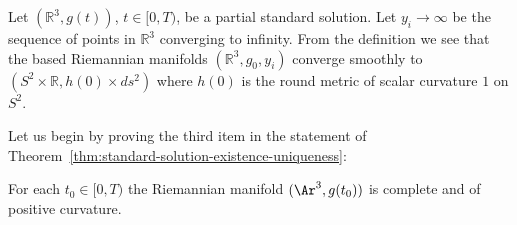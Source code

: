 Let $\left( \mathbb{R}^{3},g(t)
\right)$, $t\in [0,T)$, be a partial standard solution. Let
$y_{i}\rightarrow\infty$ be the sequence of points in
$\mathbb{R}^{3}$ converging to infinity. From the  definition we see
that the based Riemannian manifolds $\left(
\mathbb{R}^{3},g_{0},y_{i}\right)$ converge smoothly to
$(S^2\times\mathbb{R},h(0)\times ds^2)$ where $h(0)$ is the round
metric of scalar curvature $1$ on $S^2$.

Let us begin by proving the third item in the statement of
Theorem~\ref{thm:standard-solution-existence-uniqueness}:

\begin{lemma}
\label{lem:standard-flow-complete-positive-curvature}
\label{third}
For each $t_0\in [0,T)$ the Riemannian manifold $(\Ar^3,g(t_0))$ is
complete and of positive curvature.
\end{lemma}


